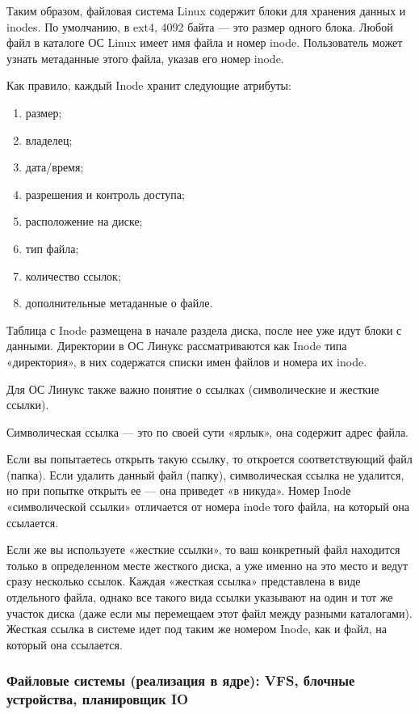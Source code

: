 \documentclass{article}
\begin{document}
Таким образом, файловая система Linux содержит блоки для хранения данных и inodes. По умолчанию, в ext4, 4092 байта — это размер одного блока. Любой файл в каталоге ОС Linux имеет имя файла и номер inode. Пользователь может узнать метаданные этого файла, указав его номер inode.

Как правило, каждый Inode хранит следующие атрибуты:
\begin{enumerate}
	\item размер;
	\item владелец;
	\item дата/время;
	\item разрешения и контроль доступа;
	\item расположение на диске;
	\item тип файла;
	\item количество ссылок;
	\item дополнительные метаданные о файле.
\end{enumerate}

Таблица с Inode размещена в начале раздела диска, после нее уже идут блоки с данными. Директории в ОС Линукс рассматриваются как Inode типа «директория», в них содержатся списки имен файлов и номера их inode.

Для ОС Линукс также важно понятие о ссылках (символические и жесткие ссылки).

Символическая ссылка — это по своей сути «ярлык», она содержит адрес файла.

Если вы попытаетесь открыть такую ссылку, то откроется соответствующий файл (папка). Если удалить данный файл (папку), символическая ссылка не удалится, но при попытке открыть ее — она приведет «в никуда». Номер Inоdе «символической ссылки» отличается от номера inоde того файла, на который она ссылается.

Если же вы используете «жесткие ссылки», то ваш конкретный файл находится только в определенном месте жесткого диска, а уже именно на это место и ведут сразу несколько ссылок. Каждая «жесткая ссылка» представлена в виде отдельного файла, однако все такого вида ссылки указывают на один и тот же участок диска (даже если мы перемещаем этот файл между разными каталогами). Жесткая ссылка в системе идет под таким же номером Inode, как и фaйл, на который она ссылается.


\subsubsection{Файловые системы (реализация в ядре): VFS, блочные устройства, планировщик IO}
\end{document}
